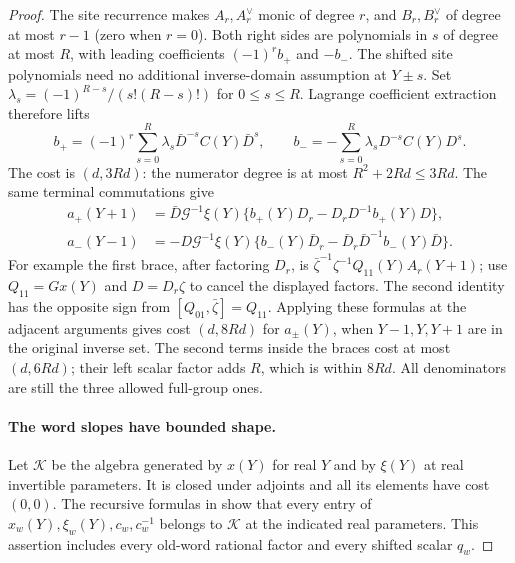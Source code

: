 \begin{proof}
The site recurrence makes $A_r,A_r^\vee$ monic of degree $r$,
and $B_r,B_r^\vee$ of degree at most $r-1$ (zero when $r=0$).
Both right sides are polynomials in $s$ of degree at most
$R$, with leading coefficients $(-1)^rb_+$ and $-b_-$.
The shifted site polynomials need no additional inverse-domain
assumption at $Y\pm s$.
Set $\lambda_s=(-1)^{R-s}/(s!(R-s)!)$ for $0\le s\le R$.
Lagrange coefficient extraction therefore lifts
\[
 b_+=(-1)^r\sum_{s=0}^R\lambda_s\bar D^{-s}C(Y)\bar D^s,
 \qquad
 b_-=-\sum_{s=0}^R\lambda_s D^{-s}C(Y)D^s.
\]
The cost is $(d,3Rd)$: the numerator degree is at most
$R^2+2Rd\le3Rd$.  The same terminal commutations give
\begin{align}
 a_+(Y+1)&=\bar D\mathcal G^{-1}\xi(Y)
       \{b_+(Y)D_r-D_rD^{-1}b_+(Y)D\},\label{actual-top-lift-ap}\\
 a_-(Y-1)&=-D\mathcal G^{-1}\xi(Y)
       \{b_-(Y)\bar D_r-\bar D_r\bar D^{-1}b_-(Y)\bar D\}.
                                                    \label{actual-top-lift-am}
\end{align}
For example the first brace, after factoring $D_r$, is
$\bar\zeta^{-1}\zeta^{-1}Q_{11}(Y)A_r(Y+1)$;
use $Q_{11}=Gx(Y)$ and $D=D_r\zeta$ to cancel the
displayed factors.  The second identity has the opposite
sign from $[Q_{01},\bar\zeta]=Q_{11}$.
Applying these formulas at the adjacent arguments gives
cost $(d,8Rd)$ for $a_\pm(Y)$, when $Y-1,Y,Y+1$ are
in the original inverse set.  The second terms inside
the braces cost at most $(d,6Rd)$; their left scalar
factor adds $R$, which is within $8Rd$.
All denominators are still the three allowed full-group
ones.\cite{top-lift-basic-source}

\paragraph{The word slopes have bounded shape.}
Let $\mathcal K$ be the algebra generated by $x(Y)$ for
real $Y$ and by $\xi(Y)$ at real invertible parameters.
It is closed under adjoints and all its elements have
cost $(0,0)$.  The recursive formulas in
show that every entry of
$x_w(Y),\xi_w(Y),c_w,c_w^{-1}$ belongs to $\mathcal K$ at
the indicated real parameters.  This assertion includes
every old-word rational factor and every shifted scalar
$q_w$.


\end{proof}
